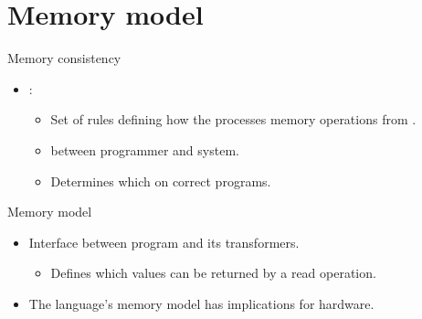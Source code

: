 \section{Memory model}

\begin{frame}[t]{Memory consistency}
\makebox[\textwidth][c]{}
\begin{itemize}
  \item {}:
    \begin{itemize}
      \item Set of rules defining how the
             processes memory operations from 
             .
      \item {} between programmer and system.
      \item Determines which  on correct programs.
    \end{itemize}
\end{itemize}
\end{frame}

\begin{frame}[t]{Memory model}
\begin{itemize}
  \item Interface between program and its transformers.
    \begin{itemize}
      \item Defines which values can be returned by a read operation.
    \end{itemize}
  \item The language's memory model has implications for hardware.
\end{itemize}
\makebox[\textwidth][c]{}
\end{frame}

